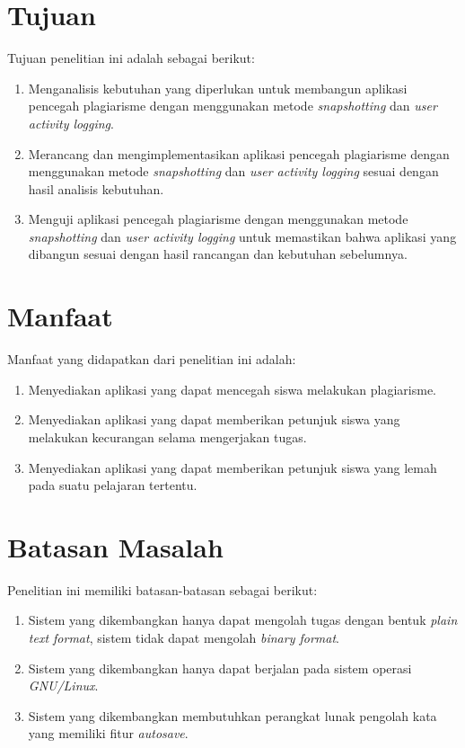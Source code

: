 \section{Tujuan}

Tujuan penelitian ini adalah sebagai berikut:

\begin{enumerate}
\item Menganalisis kebutuhan yang diperlukan untuk membangun aplikasi
  pencegah plagiarisme dengan menggunakan metode \emph{snapshotting}
  dan \emph{user activity logging}.
\item Merancang dan mengimplementasikan aplikasi pencegah plagiarisme
  dengan menggunakan metode \emph{snapshotting} dan \emph{user
    activity logging} sesuai dengan hasil analisis kebutuhan.
\item Menguji aplikasi pencegah plagiarisme dengan menggunakan metode
  \emph{snapshotting} dan \emph{user activity logging} untuk
  memastikan bahwa aplikasi yang dibangun sesuai dengan hasil
  rancangan dan kebutuhan sebelumnya.
\end{enumerate}


\section{Manfaat}

Manfaat yang didapatkan dari penelitian ini adalah:

\begin{enumerate}
\item Menyediakan aplikasi yang dapat mencegah siswa melakukan
  plagiarisme.
\item Menyediakan aplikasi yang dapat memberikan petunjuk siswa yang
  melakukan kecurangan selama mengerjakan tugas.
\item Menyediakan aplikasi yang dapat memberikan petunjuk siswa yang
  lemah pada suatu pelajaran tertentu.
\end{enumerate}

\section{Batasan Masalah}

Penelitian ini memiliki batasan-batasan sebagai berikut:

\begin{enumerate}
\item Sistem yang dikembangkan hanya dapat mengolah tugas dengan bentuk \emph{plain text
    format}, sistem tidak dapat mengolah \emph{binary format}.
\item Sistem yang dikembangkan hanya dapat berjalan pada sistem operasi \emph{GNU/Linux}.
\item Sistem yang dikembangkan membutuhkan perangkat lunak pengolah kata yang memiliki
  fitur \emph{autosave}.
\end{enumerate}


